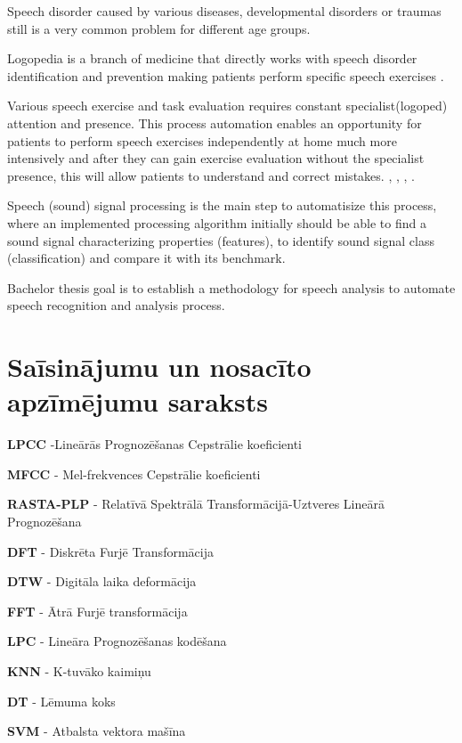 \documentclass[12pt,paper=A4]{report}
\begin{document}
Speech disorder caused by various diseases, developmental disorders or 
traumas still is a very common problem for different age groups.
 
Logopedia is a branch of medicine that directly works with speech 
disorder identification and prevention making patients perform 
specific speech exercises \cite{dtw35}.

Various speech exercise and task evaluation
requires constant specialist(logoped) attention and presence.
This process automation enables an opportunity
for patients to perform speech 
exercises independently at home much more intensively 
and after they can gain exercise evaluation without 
the specialist presence, this will
allow patients to understand and correct mistakes.
\cite{dtw34}, \cite{dtw33}, \cite{dtw32}, \cite{dtw31}.

Speech (sound) signal processing is the main step to
automatisize this process,
where an implemented processing algorithm initially should
be able to find a sound signal characterizing 
properties (features), to identify sound signal class 
(classification) and compare it with its benchmark.

Bachelor thesis goal is to establish a methodology for speech 
analysis to automate speech recognition and analysis 
process.


 
\chapter*{Saīsinājumu un nosacīto apzīmējumu saraksts}

\textbf{LPCC} -Lineārās Prognozēšanas Cepstrālie koeficienti

\textbf{MFCC} - Mel-frekvences Cepstrālie koeficienti

\textbf{RASTA-PLP} - Relatīvā Spektrālā Transformācijā-Uztveres Lineārā Prognozēšana

\textbf{DFT} - Diskrēta Furjē Transformācija

\textbf{DTW} - Digitāla laika deformācija

\textbf{FFT} - Ātrā Furjē transformācija

\textbf{LPC} - Lineāra Prognozēšanas kodēšana

\textbf{KNN} - K-tuvāko kaimiņu 

\textbf{DT} - Lēmuma koks

\textbf{SVM} - Atbalsta vektora mašīna
\end{document}

